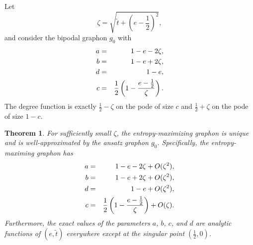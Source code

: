 \documentclass[10pt,a4paper]{amsart}
\newtheorem{theorem}{Theorem}
\begin{document}
Let 
\begin{equation} 
\zeta = \sqrt{\tilde t + (e - \frac12)^2}, 
\end{equation}
and consider the bipodal graphon $g_0$ with 
\begin{eqnarray}\label{eq:ansatz}
a & = & 1 - e - 2\zeta, \cr 
b & = & 1-e + 2 \zeta, \cr
d & = & 1-e, \cr 
c & = & \frac12 \left (1 - \frac{e-\frac12}{\zeta} \right ). 
\end{eqnarray}
The degree function is exactly $\frac 12 - \zeta$ on the pode of size $c$ and $\frac12 + \zeta$ on the pode of size $1-c$.  

\begin{theorem}\label{thm:low-t} For sufficiently small $\zeta$, the entropy-maximizing graphon is 
unique and is well-approximated by the ansatz graphon $g_0$. Specifically, the 
entropy-maximing graphon has 
\begin{eqnarray}\label{what-is-g}
a & = & 1 - e - 2\zeta + O(\zeta^2), \cr 
b & = & 1-e + 2 \zeta + O(\zeta^2), \cr
d & = & 1-e + O(\zeta^2), \cr 
c & = & \frac12 \left (1 - \frac{e-\frac12}{\zeta} \right ) + O(\zeta).
\end{eqnarray}
Furthermore, the exact values of the parameters $a$, $b$, $c$, and $d$ 
are analytic functions of $(e,\tilde t)$ everywhere except at the singular point 
$(\frac12, 0)$. 
\end{theorem}
\end{document}
